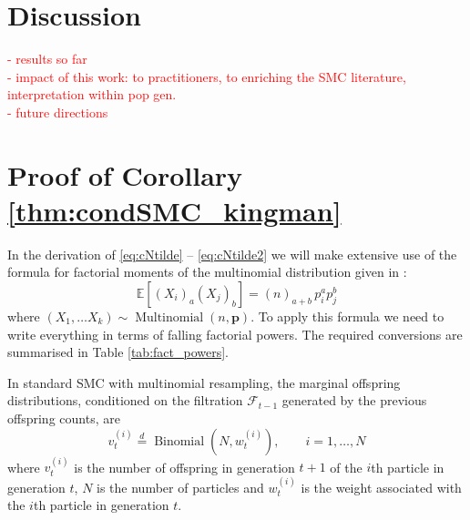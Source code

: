 \documentclass[fleqn]{article}
\theoremstyle{definition}
\newcommand{\E}{\mathbb{E}}
\newcommand{\eqdist}{\overset{d}{=}}
\newcommand{\Mn}{\operatorname{Multinomial}}
\newcommand{\Bin}{\operatorname{Binomial}}
\newcommand{\F}{\mathcal{F}_{t-1}}
\newcommand{\vt}[2][t]{v_{#1}^{(#2)}}
\newcommand{\wt}[2][t]{w_{#1}^{(#2)}}
\begin{document}
\section{Discussion}\label{sec:discussion}
\textcolor{red}{
- results so far\\
- impact of this work: to practitioners, to enriching the SMC literature, interpretation within pop gen.\\
- future directions
}

\appendix
\section{Proof of Corollary \ref{thm:condSMC_kingman}}
In the derivation of \eqref{eq:cNtilde} -- \eqref{eq:cNtilde2} we will make extensive use of the formula for factorial moments of the multinomial distribution given in \citet[p.67]{mosimann1962}:
\begin{equation} \label{eq:mn_moments}
\E[(X_i)_a(X_j)_b] = (n)_{a+b}\, p_i^a p_j^b
\end{equation}
where $(X_1,\dots X_k) \sim \Mn(n, \mathbf{p})$.
To apply this formula we need to write everything in terms of falling factorial powers. The required conversions are summarised in Table \ref{tab:fact_powers}.

In standard SMC with multinomial resampling, the marginal offspring distributions, conditioned on the filtration $\F$ generated by the previous offspring counts, are
\begin{equation*}
\vt{i} \eqdist \Bin (N, \wt{i}), \qquad i=1,\dots,N
\end{equation*}
where $\vt{i}$ is the number of offspring in generation $t+1$ of the $i$th particle in generation $t$, $N$ is the number of particles and $\wt{i}$ is the weight associated with the $i$th particle in generation $t$.
\end{document}
